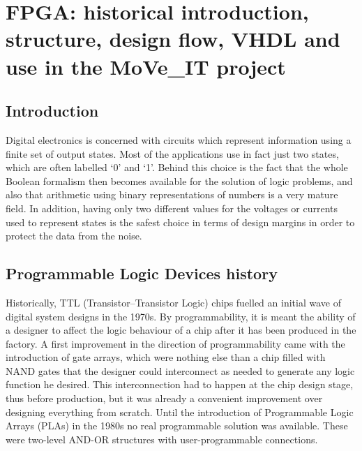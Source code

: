 \chapter{FPGA: historical introduction, structure, design flow, VHDL and use in the MoVe\_IT project}
\section{Introduction}
\noindent Digital electronics is concerned with circuits which represent information using a finite set of output
states. Most of the applications use in fact just two states, which are often labelled ‘0’ and ‘1’.
Behind this choice is the fact that the whole Boolean formalism then becomes available for the
solution of logic problems, and also that arithmetic using binary representations of numbers is a very
mature field\cite{fpga1}.
\newline
In addition, having only two
different values for the voltages or currents used to represent states is the safest choice in terms of
design margins in order to protect the data from the noise.



\section{Programmable Logic Devices history}
\noindent Historically, TTL (Transistor–Transistor Logic) chips fuelled an initial wave of digital system designs in
the 1970s.
By programmability, it is meant the ability of a
designer to affect the logic behaviour of a chip after it has been produced in the factory.
\newline
\noindent A first improvement in the direction of programmability came with the introduction of gate
arrays, which were nothing else than a chip filled with NAND gates that the designer could
interconnect as needed to generate any logic function he desired.
This interconnection had to happen
at the chip design stage, thus before production, but it was already a convenient improvement over
designing everything from scratch. Until the introduction of Programmable Logic
Arrays (PLAs) in the 1980s no real programmable solution was available. These were two-level AND-OR
structures with user-programmable connections.

